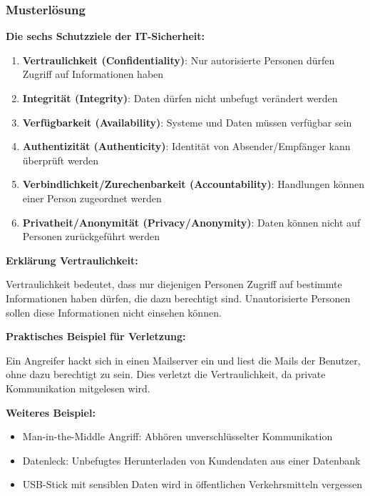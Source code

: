 \documentclass[12pt,a4paper]{article}
\begin{document}
\subsubsection*{Musterlösung}

\begin{tcolorbox}[colback=solutionbg, colframe=black!30]

\textbf{Die sechs Schutzziele der IT-Sicherheit:} \checkmark

\begin{enumerate}
    \item \textbf{Vertraulichkeit (Confidentiality)}: Nur autorisierte Personen dürfen Zugriff auf Informationen haben
    \item \textbf{Integrität (Integrity)}: Daten dürfen nicht unbefugt verändert werden
    \item \textbf{Verfügbarkeit (Availability)}: Systeme und Daten müssen verfügbar sein
    \item \textbf{Authentizität (Authenticity)}: Identität von Absender/Empfänger kann überprüft werden
    \item \textbf{Verbindlichkeit/Zurechenbarkeit (Accountability)}: Handlungen können einer Person zugeordnet werden
    \item \textbf{Privatheit/Anonymität (Privacy/Anonymity)}: Daten können nicht auf Personen zurückgeführt werden
\end{enumerate}

\textbf{Erklärung Vertraulichkeit:} \checkmark

Vertraulichkeit bedeutet, dass nur diejenigen Personen Zugriff auf bestimmte Informationen haben dürfen, die dazu berechtigt sind. Unautorisierte Personen sollen diese Informationen nicht einsehen können.

\textbf{Praktisches Beispiel für Verletzung:} \checkmark

Ein Angreifer hackt sich in einen Mailserver ein und liest die Mails der Benutzer, ohne dazu berechtigt zu sein. Dies verletzt die Vertraulichkeit, da private Kommunikation mitgelesen wird.

\textbf{Weiteres Beispiel:}
\begin{itemize}
    \item Man-in-the-Middle Angriff: Abhören unverschlüsselter Kommunikation
    \item Datenleck: Unbefugtes Herunterladen von Kundendaten aus einer Datenbank
    \item USB-Stick mit sensiblen Daten wird in öffentlichen Verkehrsmitteln vergessen
\end{itemize}

\end{tcolorbox}
\end{document}
